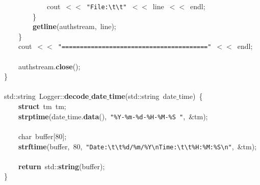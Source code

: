\mbox{}\ \ \ \ \ \ \ \ \ \ \ \ cout\ $<$$<$\ \texttt{"{}File:}\texttt{\textbackslash{}t\textbackslash{}t}\texttt{"{}}\ $<$$<$\ line\ $<$$<$\ endl; \\
\mbox{}\ \ \ \ \ \ \ \ \} \\
\mbox{}\ \ \ \ \ \ \ \ \textbf{getline}(authstream,\ line); \\
\mbox{}\ \ \ \ \} \\
\mbox{}\ \ \ \ cout\ $<$$<$\ \texttt{"{}========================================"{}}\ $<$$<$\ endl; \\
\mbox{} \\
\mbox{}\ \ \ \ authstream.\textbf{close}(); \\
\mbox{}\} \\
\mbox{} \\
\mbox{}std::string\ Logger::\textbf{decode$\_$date$\_$time}(std::string\ date$\_$time)\ \{ \\
\mbox{}\ \ \ \ \textbf{struct}\ tm\ tm; \\
\mbox{}\ \ \ \ \textbf{strptime}(date$\_$time.\textbf{data}(),\ \texttt{"{}\%Y-\%m-\%d-\%H-\%M-\%S\ "{}},\ \&tm); \\
\mbox{}\ \ \ \  \\
\mbox{}\ \ \ \ char\ buffer[80]; \\
\mbox{}\ \ \ \ \textbf{strftime}(buffer,\ 80,\ \texttt{"{}Date:}\texttt{\textbackslash{}t\textbackslash{}t}\texttt{\%d/\%m/\%Y}\texttt{\textbackslash{}n}\texttt{Time:}\texttt{\textbackslash{}t\textbackslash{}t}\texttt{\%H:\%M:\%S}\texttt{\textbackslash{}n}\texttt{"{}},\ \&tm); \\
\mbox{} \\
\mbox{}\ \ \ \ \textbf{return}\ std::\textbf{string}(buffer); \\
\mbox{}\} \\

\clearpage
\normalsize
\rmfamily
